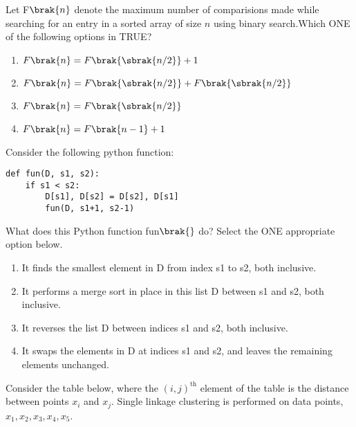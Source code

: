 \iffalse
  \author{EE24BTECH11032}
  \section{da}
  \chapter{2024}
\fi


\item Let F$\brak{n}$ denote the maximum number of comparisions made while searching for an entry in a sorted array of size $n$ using binary search.Which ONE of the following options in TRUE?
    \begin{enumerate}
        \item $F\brak{n}=F\brak{\sbrak{n/2}}+1$
        \item $F\brak{n}=F\brak{\sbrak{n/2}}+F\brak{\sbrak{n/2}}$
        \item $F\brak{n}=F\brak{\sbrak{n/2}}$
        \item ${F\brak{n}=F\brak{n-1}+1}$
    \end{enumerate}
    \item Consider the following python function:\\
    \begin{verbatim}
def fun(D, s1, s2):
    if s1 < s2:
        D[s1], D[s2] = D[s2], D[s1]
        fun(D, s1+1, s2-1)
\end{verbatim}
What does this Python function fun$\brak{}$ do? Select the ONE appropriate option below.\\
\begin{enumerate}
    \item It finds the smallest element in D from index s1 to s2, both inclusive.
    \item It performs a merge sort in place in this list D between  s1 and s2, both inclusive.
    \item It reverses the list D between indices s1 and s2, both inclusive.
    \item It swaps the elements in D at indices s1 and s2, and leaves the remaining elements unchanged.
\end{enumerate}


\item Consider the table below, where the $(i, j)^{\text{th}}$ element of the table is the distance between points $x_i$ and $x_j$. Single linkage clustering is performed on data points, $x_1, x_2, x_3, x_4, x_5$.

